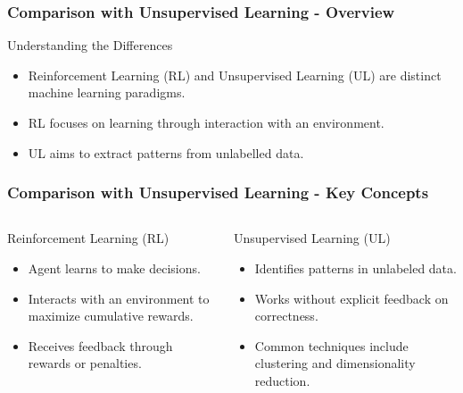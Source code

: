 \documentclass[aspectratio=169]{beamer}
\begin{document}
\begin{frame}[fragile]
    \frametitle{Comparison with Unsupervised Learning - Overview}
    \begin{block}{Understanding the Differences}
        \begin{itemize}
            \item Reinforcement Learning (RL) and Unsupervised Learning (UL) are distinct machine learning paradigms.
            \item RL focuses on learning through interaction with an environment.
            \item UL aims to extract patterns from unlabelled data.
        \end{itemize}
    \end{block}
\end{frame}

\begin{frame}[fragile]
    \frametitle{Comparison with Unsupervised Learning - Key Concepts}
    \begin{columns}
            \begin{block}{Reinforcement Learning (RL)}
                \begin{itemize}
                    \item Agent learns to make decisions.
                    \item Interacts with an environment to maximize cumulative rewards.
                    \item Receives feedback through rewards or penalties.
                \end{itemize}
            \end{block}

            \begin{block}{Unsupervised Learning (UL)}
                \begin{itemize}
                    \item Identifies patterns in unlabeled data.
                    \item Works without explicit feedback on correctness.
                    \item Common techniques include clustering and dimensionality reduction.
                \end{itemize}
            \end{block}
    \end{columns}
\end{frame}
\end{document}
